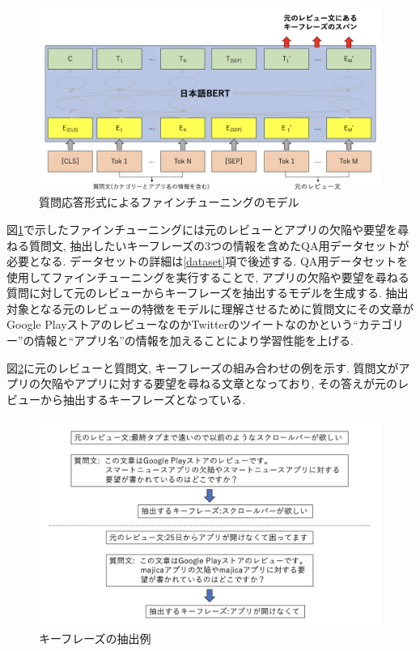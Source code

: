 \begin{figure}[H]
  \centering
  \includegraphics[scale=0.3]
    {contents/images/fine-tuning.png}
  \caption{質問応答形式によるファインチューニングのモデル\label{fig:fine-tuning}}
\end{figure}
\noindent
図\ref{fig:fine-tuning}で示したファインチューニングには元のレビューとアプリの欠陥や要望を尋ねる質問文, 抽出したいキーフレーズの3つの情報を含めたQA用データセットが必要となる. データセットの詳細は\ref{dataset}項で後述する. 
QA用データセットを使用してファインチューニングを実行することで, アプリの欠陥や要望を尋ねる質問に対して元のレビューからキーフレーズを抽出するモデルを生成する. 
抽出対象となる元のレビューの特徴をモデルに理解させるために質問文にその文章がGoogle PlayストアのレビューなのかTwitterのツイートなのかという``カテゴリー''の情報と``アプリ名''の情報を加えることにより学習性能を上げる. 

図\ref{fig:answer}に元のレビューと質問文, キーフレーズの組み合わせの例を示す. 質問文がアプリの欠陥やアプリに対する要望を尋ねる文章となっており, その答えが元のレビューから抽出するキーフレーズとなっている. 

\begin{figure}[H]
  \centering
  \includegraphics[scale=0.4]
       {contents/images/answer.png}
  \caption{キーフレーズの抽出例\label{fig:answer}}
\end{figure}

